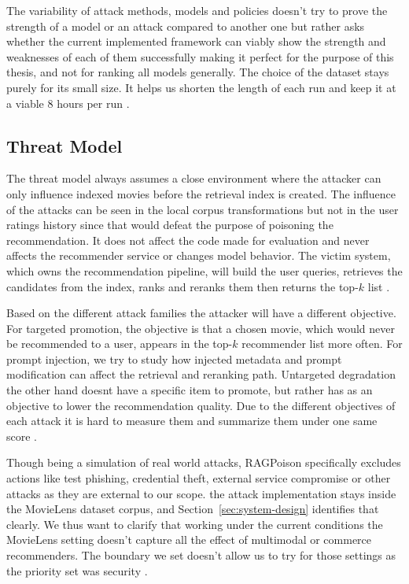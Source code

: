 The variability of attack methods, models and policies doesn't try to prove the strength of a model or an attack compared to another one but rather asks whether the current implemented framework can viably show the strength and weaknesses of each of them successfully making it perfect for the purpose of this thesis, and not for ranking all models generally. The choice of the dataset stays purely for its small size. It helps us shorten the length of each run and keep it at a viable 8 hours per run \cite{ragpoisonlab_repo}.

\subsection{Threat Model}

The threat model always assumes a close environment where the attacker can only influence indexed movies before the retrieval index is created. The influence of the attacks can be seen in the local corpus transformations but not in the user ratings history since that would defeat the purpose of poisoning the recommendation. It does not affect the code made for evaluation and never affects the recommender service or changes model behavior. The victim system, which owns the recommendation pipeline, will build the user queries, retrieves the candidates from the index, ranks and reranks them then returns the top-$k$ list \cite{ragpoisonlab_repo,zhong2023retrievalcorpora,zou2025poisonedrag_usenix,zhang2024humanimperceptible}. 

Based on the different attack families the attacker will have a different objective. For targeted promotion, the objective is that a chosen movie, which would never be recommended to a user, appears in the top-$k$ recommender list more often. For prompt injection, we try to study how injected metadata and prompt modification can affect the retrieval and reranking path. Untargeted degradation the other hand doesnt have a specific item to promote, but rather has as an objective to lower the recommendation quality. Due to the different objectives of each attack it is hard to measure them and summarize them under one same score \cite{ragpoisonlab_repo,li2016factorizationpoison,nguyen2024manipulatingrecsys,wang2024recpoisonsurvey}.

Though being a simulation of real world attacks, RAGPoison specifically excludes actions like test phishing, credential theft, external service compromise or other attacks as they are external to our scope. the attack implementation stays inside the MovieLens dataset corpus, and Section~\ref{sec:system-design} identifies that clearly. We thus want to clarify that working under the current conditions the MovieLens setting doesn't capture all the effect of multimodal or commerce recommenders. The boundary we set doesn't allow us to try for those settings as the priority set was security \cite{ragpoisonlab_repo,perez2022redteaming,mazeika2024harmbench}.


